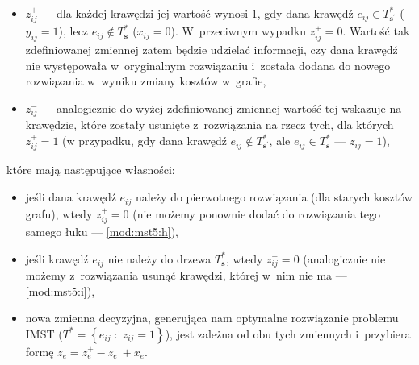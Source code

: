 \begin{itemize}
	\item $z_{ij}^{+}$ --- dla każdej krawędzi jej wartość wynosi $1$, gdy dana krawędź $e_{ij} \in T^{\ast}_{\textbf{s}^{\prime}}$ ($y_{ij} = 1$), lecz $e_{ij} \notin T^{\ast}_{\textbf{s}}$ ($x_{ij} = 0$).
	W~przeciwnym wypadku $z_{ij}^{+} = 0$.
	Wartość tak zdefiniowanej zmiennej zatem będzie udzielać informacji, czy dana krawędź nie występowała w~oryginalnym rozwiązaniu i~została dodana do nowego rozwiązania w~wyniku zmiany kosztów w~grafie,
	\item $z_{ij}^{-}$ --- analogicznie do wyżej zdefiniowanej zmiennej wartość tej wskazuje na krawędzie, które zostały usunięte z~rozwiązania na rzecz tych, dla których $z_{ij}^{+} = 1$ (w przypadku, gdy dana krawędź $e_{ij} \notin T^{\ast}_{\textbf{s}^{\prime}}$, ale $e_{ij} \in T^{\ast}_{\textbf{s}}$ --- $z_{ij}^{-} = 1$),
\end{itemize}
które mają następujące własności:
\begin{itemize}
	\item jeśli dana krawędź $e_{ij}$ należy do pierwotnego rozwiązania (dla starych kosztów grafu), wtedy $z_{ij}^{+} = 0$ (nie możemy ponownie dodać do rozwiązania tego samego łuku --- \ref{mod:mst5:h}),
	\item jeśli krawędź $e_{ij}$ nie należy do drzewa $T^{\ast}_{\textbf{s}}$, wtedy $z_{ij}^{-} = 0$ (analogicznie nie możemy z~rozwiązania usunąć krawędzi, której w~nim nie ma --- \ref{mod:mst5:i}),
	\item nowa zmienna decyzyjna, generująca nam optymalne rozwiązanie problemu \textsc{IMST} ($T^{\ast} = \left\{ e_{ij} \; : \; z_{ij} = 1 \right\}$), jest zależna od obu tych zmiennych i~przybiera formę $z_{e} = z^{+}_{e} - z^{-}_{e} + x_{e}$.
\end{itemize}

